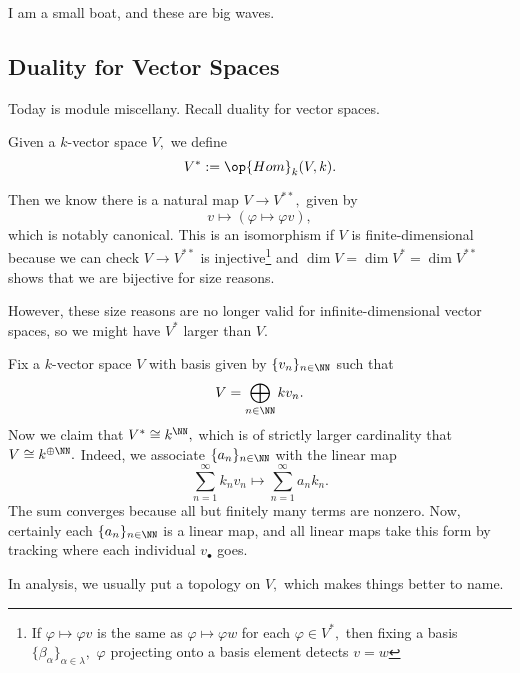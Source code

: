 \documentclass[../notes.tex]{subfiles}
\begin{document}













I am a small boat, and these are big waves.

\subsection{Duality for Vector Spaces}
Today is module miscellany. Recall duality for vector spaces.
\begin{definition}
	Given a $k$-vector space $V,$ we define
	\[V^*:=\op{Hom}_k(V,k).\]
\end{definition}
Then we know there is a natural map $V\to V^{**},$ given by
\[v\mapsto(\varphi\mapsto\varphi v),\]
which is notably canonical. This is an isomorphism if $V$ is finite-dimensional because we can check $V\to V^{**}$ is injective\footnote{If $\varphi\mapsto\varphi v$ is the same as $\varphi\mapsto\varphi w$ for each $\varphi\in V^*,$ then fixing a basis $\{\beta_\alpha\}_{\alpha\in\lambda},$ $\varphi$ projecting onto a basis element detects $v=w$} and $\dim V=\dim V^*=\dim V^{**}$ shows that we are bijective for size reasons.

However, these size reasons are no longer valid for infinite-dimensional vector spaces, so we might have $V^*$ larger than $V.$
\begin{nex}
	Fix a $k$-vector space $V$ with basis given by $\{v_n\}_{n\in\NN}$ such that
	\[V=\bigoplus_{n\in\NN}kv_n.\]
	Now we claim that $V^*\cong k^\NN,$ which is of strictly larger cardinality that $V\cong k^{\oplus\NN}.$ Indeed, we associate $\{a_n\}_{n\in\NN}$ with the linear map
	\[\sum_{n=1}^\infty k_nv_n\mapsto\sum_{n=1}^\infty a_nk_n.\]
	The sum converges because all but finitely many terms are nonzero. Now, certainly each $\{a_n\}_{n\in\NN}$ is a linear map, and all linear maps take this form by tracking where each individual $v_\bullet$ goes.
\end{nex}
In analysis, we usually put a topology on $V,$ which makes things better to name.
\end{document}
